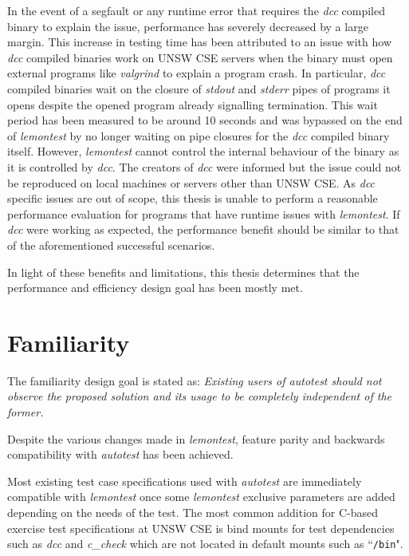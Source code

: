 \documentclass[hidelinks]{report}
\begin{document}
In the event of a segfault or any runtime error that requires the \textit{dcc} compiled binary to explain the issue, performance has severely decreased by a large margin. This increase in testing time has been attributed to an issue with how \textit{dcc} compiled binaries work on UNSW CSE servers when the binary must open external programs like \textit{valgrind} to explain a program crash. In particular, \textit{dcc} compiled binaries wait on the closure of \textit{stdout} and \textit{stderr} pipes of programs it opens despite the opened program already signalling termination. This wait period has been measured to be around 10 seconds and was bypassed on the end of \textit{lemontest} by no longer waiting on pipe closures for the \textit{dcc} compiled binary itself. However, \textit{lemontest} cannot control the internal behaviour of the binary as it is controlled by \textit{dcc}. The creators of \textit{dcc} were informed but the issue could not be reproduced on local machines or servers other than UNSW CSE. As \textit{dcc} specific issues are out of scope, this thesis is unable to perform a reasonable performance evaluation for programs that have runtime issues with \textit{lemontest}. If \textit{dcc} were working as expected, the performance benefit should be similar to that of the aforementioned successful scenarios.

In light of these benefits and limitations, this thesis determines that the performance and efficiency design goal has been mostly met.

\clearpage
\section{Familiarity}
The familiarity design goal is stated as: \textit{Existing users of autotest should not observe the proposed solution and its usage to be completely independent of the former.}

Despite the various changes made in \textit{lemontest}, feature parity and backwards compatibility with \textit{autotest} has been achieved.

Most existing test case specifications used with \textit{autotest} are immediately compatible with \textit{lemontest} once some \textit{lemontest} exclusive parameters are added depending on the needs of the test. The most common addition for C-based exercise test specifications at UNSW CSE is bind mounts for test dependencies such as \textit{dcc} and \textit{c\_check} which are not located in default mounts such as ``\lstinline|/bin|".
\end{document}
